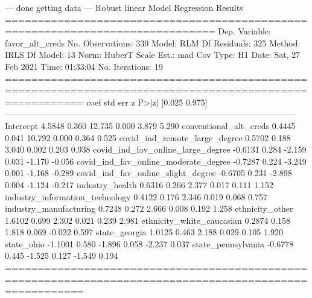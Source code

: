 ---
done getting data
---
                    Robust linear Model Regression Results                    
==============================================================================
Dep. Variable:        favor_alt_creds   No. Observations:                  339
Model:                            RLM   Df Residuals:                      325
Method:                          IRLS   Df Model:                           13
Norm:                          HuberT                                         
Scale Est.:                       mad                                         
Cov Type:                          H1                                         
Date:                Sat, 27 Feb 2021                                         
Time:                        01:33:04                                         
No. Iterations:                    19                                         
========================================================================================================
                                           coef    std err          z      P>|z|      [0.025      0.975]
--------------------------------------------------------------------------------------------------------
Intercept                                4.5848      0.360     12.735      0.000       3.879       5.290
conventional_alt_creds                   0.4445      0.041     10.792      0.000       0.364       0.525
covid_ind_remote_large_degree            0.5702      0.188      3.040      0.002       0.203       0.938
covid_ind_fav_online_large_degree       -0.6131      0.284     -2.159      0.031      -1.170      -0.056
covid_ind_fav_online_moderate_degree    -0.7287      0.224     -3.249      0.001      -1.168      -0.289
covid_ind_fav_online_slight_degree      -0.6705      0.231     -2.898      0.004      -1.124      -0.217
industry_health                          0.6316      0.266      2.377      0.017       0.111       1.152
industry_information_technology          0.4122      0.176      2.346      0.019       0.068       0.757
industry_manufacturing                   0.7248      0.272      2.666      0.008       0.192       1.258
ethnicity_other                          1.6102      0.699      2.302      0.021       0.239       2.981
ethnicity_white_caucasian                0.2874      0.158      1.818      0.069      -0.022       0.597
state_georgia                            1.0125      0.463      2.188      0.029       0.105       1.920
state_ohio                              -1.1001      0.580     -1.896      0.058      -2.237       0.037
state_pennsylvania                      -0.6778      0.445     -1.525      0.127      -1.549       0.194
========================================================================================================

